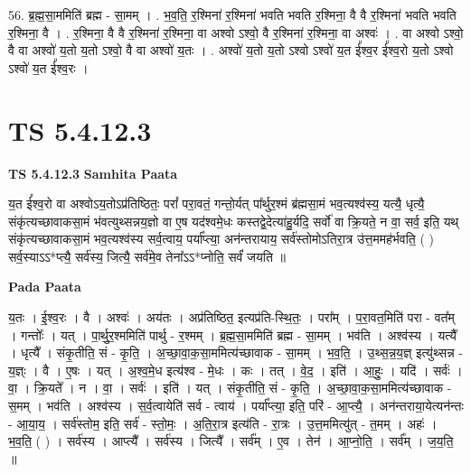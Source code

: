 \documentclass[17pt]{extarticle}
\begin{document}
56. ब्र॒ह्म॒सा॒ममिति॑ ब्रह्म - सा॒मम् । . भ॒व॒ति॒ र॒श्मिना॑ र॒श्मिना॑ भवति भवति र॒श्मिना॒ वै वै र॒श्मिना॑ भवति भवति र॒श्मिना॒ वै । . र॒श्मिना॒ वै वै र॒श्मिना॑ र॒श्मिना॒ वा अश्वो ऽश्वो॒ वै र॒श्मिना॑ र॒श्मिना॒ वा अश्वः॑ । . वा अश्वो ऽश्वो॒ वै वा अश्वो॑ य॒तो य॒तो ऽश्वो॒ वै वा अश्वो॑ य॒तः । . अश्वो॑ य॒तो य॒तो ऽश्वो ऽश्वो॑ य॒त ई᳚श्व॒र ई᳚श्व॒रो य॒तो ऽश्वो ऽश्वो॑ य॒त ई᳚श्व॒रः । \newline
\pagebreak
{}

\section{ TS 5.4.12.3 }

\textbf{TS 5.4.12.3 } \newline
\textbf{Samhita Paata} \newline

य॒त ई᳚श्व॒रो वा अश्वोऽय॒तोऽप्र॑तिष्ठितः॒ परां᳚ परा॒वतं॒ गन्तो॒र्यत् पा᳚र्थुर॒श्मं ब्र॑ह्मसा॒मं भव॒त्यश्व॑स्य॒ यत्यै॒ धृत्यै॒ संकृ॑त्यच्छावाकसा॒मं भ॑वत्युथ्सन्नय॒ज्ञो वा ए॒ष यद॑श्वमे॒धः कस्तद्वे॒देत्या॑हु॒र्यदि॒ सर्वो॑ वा क्रि॒यते॒ न वा॒ सर्व॒ इति॒ यथ् संकृ॑त्यच्छावाकसा॒मं भव॒त्यश्व॑स्य सर्व॒त्वाय॒ पर्या᳚प्त्या॒ अन॑न्तरायाय॒ सर्व॑स्तोमोऽतिरा॒त्र उ॑त्त॒ममह॑र्भवति॒ ( ) सर्व॒स्याऽऽ*प्त्यै॒ सर्व॑स्य॒ जित्यै॒ सर्व॑मे॒व तेना᳚ऽऽ*प्नोति॒ सर्वं॑ जयति ॥ \newline

\textbf{Pada Paata} \newline

य॒तः । ई॒श्व॒रः । वै । अश्वः॑ । अय॑तः । अप्र॑तिष्ठित॒ इत्यप्र॑ति-स्थि॒तः॒ । परा᳚म् । प॒रा॒वत॒मिति॑ परा - वत᳚म् । गन्तोः᳚ । यत् । पा॒र्थु॒र॒श्ममिति॑ पार्थु - र॒श्मम् । ब्र॒ह्म॒सा॒ममिति॑ ब्रह्म - सा॒मम् । भव॑ति । अश्व॑स्य । यत्यै᳚ । धृत्यै᳚ । संकृ॒तीति॒ सं - कृ॒ति॒ । अ॒च्छा॒वा॒क॒सा॒ममित्य॑च्छावाक - सा॒मम् । भ॒व॒ति॒ । उ॒थ्स॒न्न॒य॒ज्ञ् इत्यु॑थ्सन्न - य॒ज्ञ्ः । वै । ए॒षः । यत् । अ॒श्व॒मे॒ध इत्य॑श्व - मे॒धः । कः । तत् । वे॒द॒ । इति॑ । आ॒हुः॒ । यदि॑ । सर्वः॑ । वा॒ । क्रि॒यते᳚ । न । वा॒ । सर्वः॑ । इति॑ । यत् । संकृ॒तीति॒ सं - कृ॒ति॒ । अ॒च्छा॒वा॒क॒सा॒ममित्य॑च्छावाक - स॒मम् । भव॑ति । अश्व॑स्य । स॒र्व॒त्वायेति॑ सर्व - त्वाय॑ । पर्या᳚प्त्या॒ इति॒ परि॑ - आ॒प्त्यै॒ । अन॑न्तराया॒येत्यन॑न्तः - आ॒या॒य॒ । सर्व॑स्तोम॒ इति॒ सर्व॑ - स्तो॒मः॒ । अ॒ति॒रा॒त्र इत्य॑ति - रा॒त्रः । उ॒त्त॒ममित्यु॑त् - त॒मम् । अहः॑ । भ॒व॒ति॒ ( ) । सर्व॑स्य । आप्त्यै᳚ । सर्व॑स्य । जित्यै᳚ । सर्व᳚म् । ए॒व । तेन॑ । आ॒प्नो॒ति॒ । सर्व᳚म् । ज॒य॒ति॒ ॥  \newline
\end{document}

